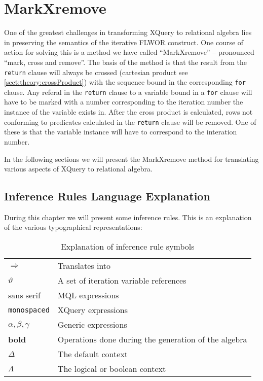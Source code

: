 \section{MarkXremove}
\label{sect:translation:mXr}

One of the greatest challenges in transforming XQuery to relational algebra lies in preserving the semantics of
the iterative FLWOR construct. One course of action for solving this is a method we have called ``MarkXremove'' --
pronounced ``mark, cross and remove''. The basis of the method is that the result from the \texttt{return} clause
will always be crossed (cartesian product see \ref{sect:theory:crossProduct}) with the sequence bound in the
corresponding \texttt{for} clause. Any referal in the \texttt{return} clause to a variable bound in a \texttt{for}
clause will have to be marked with a number corresponding to the iteration number the instance of the variable
exists in. After the cross product is calculated, rows not conforming to predicates calculated in the
\texttt{return} clause will be removed. One of these is that the variable instance will have to correspond to the
interation number.

In the following sections we will present the MarkXremove method for translating various aspects of XQuery to
relational algebra.

\subsection{Inference Rules Language Explanation}
\label{sect:translation:inferenceExplanation}
During this chapter we will present some inference rules. This is an explanation
of the various typographical representations:

\begin{table}


\begin{tabular}{l|l}

  $\Longrightarrow$  & Translates into \\
  $\vartheta$ & A set of iteration variable references \\
  \textsf{sans serif} & MQL expressions \\
  \texttt{monospaced} & XQuery expressions \\
  $\alpha , \beta, \gamma$ & Generic expressions \\
  \textbf{bold} & Operations done during the generation of the algebra \\
  $\Delta$ & The default context \\
  $\Lambda$ & The logical or boolean context \\
  
\end{tabular}
\caption{Explanation of inference rule symbols}
\label{tab:translation:inferenceRuleSymbols}
\end{table}

